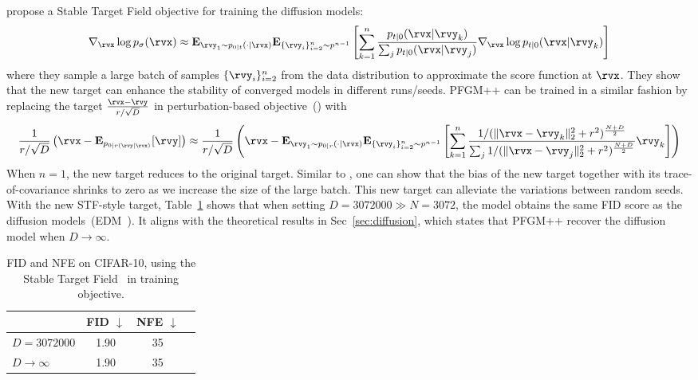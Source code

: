 \citet{Xu2023StableTF} propose a Stable Target Field objective for training the diffusion models:
\begin{align*}
    \nabla_{\rvx}\log p_\sigma(\rvx) \approx \E_{\rvy_1 \sim p_{0|t}(\cdot|\rvx)}\E_{\{\rvy_i\}_{i=2}^{n} \sim p^{n-1}}\left[{\sum_{k=1}^n \frac{p_{t|0}(\rvx|\rvy_k)}{\sum_{j} p_{t|0}(\rvx|\rvy_j)} }\nabla_{\rvx}\log p_{t|0}(\rvx|\rvy_k)\right]
\end{align*}
where they sample a large batch of samples $\{\rvy_i\}_{i=2}^n$ from the data distribution to approximate the score function at $\rvx$. They show that the new target can enhance the stability of converged models in different runs/seeds. PFGM++ can be trained in a similar fashion by replacing the target $\frac{{\rvx}-{\rvy}}{{r}/{\sqrt{D}}}$ in perturbation-based objective~() with
\begin{align*}
    \frac{1}{{r}/{\sqrt{D}}}\left(\rvx - \E_{p_{0|r(\rvy|\rvx)}}[\rvy]\right) \approx \frac{1}{{r}/{\sqrt{D}}}\left(\rvx - \E_{\rvy_1 \sim p_{0|r}(\cdot|\rvx)}\E_{\{\rvy_i\}_{i=2}^{n} \sim p^{n-1}}\left[{\sum_{k=1}^n \frac{{1}/{({\|\rvx-{\rvy_k}\|_2^2+ r^2})^\frac{N+D}{2}}}{\sum_j{1}/{({\|\rvx-{\rvy_j}\|_2^2+ r^2})^\frac{N+D}{2}}} }\rvy_k\right]\right)
\end{align*}
When $n=1$, the new target reduces to the original target. Similar to \cite{Xu2023StableTF}, one can show that the bias of the new target together with its trace-of-covariance shrinks to zero as we increase the size of the large batch. This new target can alleviate the variations between random seeds. With the new STF-style target, Table~\ref{tab:cifar-stf} shows that when setting $D=3072000\gg N=3072$, the model obtains the same FID score as the diffusion models~(EDM~\cite{Karras2022ElucidatingTD}). It aligns with the theoretical results in Sec~\ref{sec:diffusion}, which states that PFGM++ recover the diffusion model when $D\to \infty$. 
\begin{table}[htbp]
    \small
    \centering
    \caption{FID and NFE on CIFAR-10, using the Stable Target Field~\cite{Xu2023StableTF} in training objective.}
    \begin{tabular}{l c c c}
    \toprule
         &FID $\downarrow$ & NFE $\downarrow$\\
        \midrule
        $D=3072000$  &1.90 & 35\\
        $D\to \infty$~\cite{Karras2022ElucidatingTD}  &1.90 & 35\\
        \bottomrule
    \end{tabular}
    \label{tab:cifar-stf}
\end{table}


